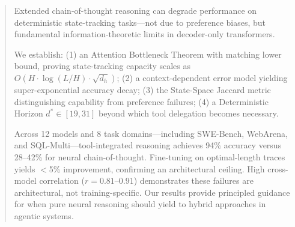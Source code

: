 \documentclass{article}
\theoremstyle{plain}
\theoremstyle{definition}
\theoremstyle{remark}
\begin{document}

\printAffiliationsAndNotice{}


\begin{abstract}
	Extended chain-of-thought reasoning can degrade performance on deterministic state-tracking tasks---not due to preference biases, but fundamental information-theoretic limits in decoder-only transformers.
	
	We establish: (1) an Attention Bottleneck Theorem with matching lower bound, proving state-tracking capacity scales as $O(H \cdot \log(L/H) \cdot \sqrt{d_h})$; (2) a context-dependent error model yielding super-exponential accuracy decay; (3) the State-Space Jaccard metric distinguishing capability from preference failures; (4) a Deterministic Horizon $d^* \in [19, 31]$ beyond which tool delegation becomes necessary.
	
	Across 12 models and 8 task domains---including SWE-Bench, WebArena, and SQL-Multi---tool-integrated reasoning achieves 94\% accuracy versus 28--42\% for neural chain-of-thought. Fine-tuning on optimal-length traces yields $<$5\% improvement, confirming an architectural ceiling. High cross-model correlation ($r = 0.81$--$0.91$) demonstrates these failures are architectural, not training-specific. Our results provide principled guidance for when pure neural reasoning should yield to hybrid approaches in agentic systems.
\end{abstract}

\end{document}
